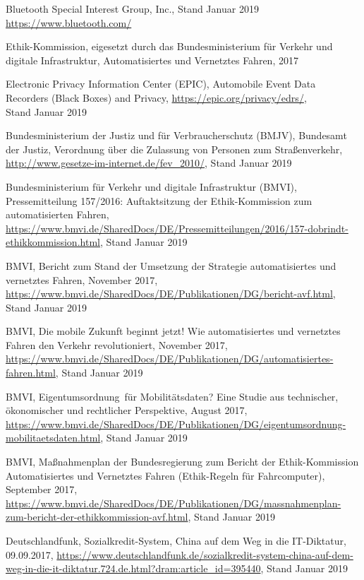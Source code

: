 \documentclass[twoside,a4paper,12pt]{article}
\begin{document}
\begin{thebibliography}{99}

 Bluetooth Special Interest Group, Inc., Stand Januar 2019\\ \url{https://www.bluetooth.com/}

 Ethik-Kommission, eigesetzt durch das Bundesministerium für Verkehr und digitale Infrastruktur, Automatisiertes und
Vernetztes Fahren, 2017

 Electronic Privacy Information Center (EPIC), Automobile Event Data Recorders (Black Boxes) and Privacy,
\url{https://epic.org/privacy/edrs/}, \\Stand Januar 2019

 Bundesministerium der Justiz und für Verbraucherschutz (BMJV), Bundesamt der Justiz, Verordnung über die Zulassung von Personen zum Straßenverkehr, 
\url{http://www.gesetze-im-internet.de/fev_2010/}, Stand Januar 2019

 Bundesministerium für Verkehr und digitale Infrastruktur (BMVI), Pressemitteilung 157/2016: Auftaktsitzung der Ethik-Kommission zum automatisierten Fahren,
\url{https://www.bmvi.de/SharedDocs/DE/Pressemitteilungen/2016/157-dobrindt-ethikkommission.html}, Stand Januar 2019

 BMVI, Bericht zum Stand der Umsetzung der Strategie automatisiertes und vernetztes Fahren,
November 2017, \url{https://www.bmvi.de/SharedDocs/DE/Publikationen/DG/bericht-avf.html}, Stand Januar 2019

 BMVI, Die mobile Zukunft beginnt jetzt! Wie automatisiertes und vernetztes Fahren den Verkehr revolutioniert,
November 2017, \url{https://www.bmvi.de/SharedDocs/DE/Publikationen/DG/automatisiertes-fahren.html}, Stand Januar 2019

 BMVI, \glqq Eigentumsordnung\grqq\ für Mobilitätsdaten? Eine Studie aus technischer, ökonomischer und rechtlicher Perspektive,
August 2017, \url{https://www.bmvi.de/SharedDocs/DE/Publikationen/DG/eigentumsordnung-mobilitaetsdaten.html}, Stand Januar 2019

 BMVI, Maßnahmenplan der Bundesregierung zum Bericht der Ethik-Kommission Automatisiertes und Vernetztes Fahren (Ethik-Regeln für
Fahrcomputer), September 2017, \url{https://www.bmvi.de/SharedDocs/DE/Publikationen/DG/massnahmenplan-zum-bericht-der-ethikkommission-avf.html}, 
Stand Januar 2019

 Deutschlandfunk, Sozialkredit-System, China auf dem Weg in die IT-Diktatur, 09.09.2017, \url{https://www.deutschlandfunk.de/sozialkredit-system-china-auf-dem-weg-in-die-it-diktatur.724.de.html?dram:article_id=395440}, Stand Januar 2019


\end{thebibliography}
\end{document}
